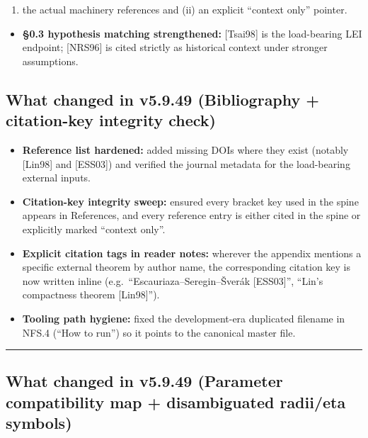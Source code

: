 \documentclass[
  11pt,
]{article}
\providecommand{\tightlist}{%
  \setlength{\itemsep}{0pt}\setlength{\parskip}{0pt}}
\begin{document}
\begin{enumerate}
\def\labelenumi{(\roman{enumi})}
\tightlist
\item
  the actual machinery references and (ii) an explicit ``context only'' pointer.
\end{enumerate}

\begin{itemize}
\tightlist
\item
  \textbf{§0.3 hypothesis matching strengthened:} {[}Tsai98{]} is the load-bearing LEI endpoint; {[}NRS96{]} is cited strictly as historical context under stronger assumptions.
\end{itemize}

\hypertarget{what-changed-in-v5.9.49-bibliography-citation-key-integrity-check}{%
\subsection{What changed in v5.9.49 (Bibliography + citation-key integrity check)}\label{what-changed-in-v5.9.49-bibliography-citation-key-integrity-check}}

\begin{itemize}
\tightlist
\item
  \textbf{Reference list hardened:} added missing DOIs where they exist (notably {[}Lin98{]} and {[}ESS03{]}) and verified the journal metadata for the load-bearing external inputs.
\item
  \textbf{Citation-key integrity sweep:} ensured every bracket key used in the spine appears in References, and every reference entry is either cited in the spine or explicitly marked ``context only''.
\item
  \textbf{Explicit citation tags in reader notes:} wherever the appendix mentions a specific external theorem by author name, the corresponding citation key is now written inline (e.g.~``Escauriaza--Seregin--Šverák {[}ESS03{]}'', ``Lin's compactness theorem {[}Lin98{]}'').
\item
  \textbf{Tooling path hygiene:} fixed the development-era duplicated filename in NFS.4 (``How to run'') so it points to the canonical master file.
\end{itemize}

\begin{center}\rule{0.5\linewidth}{0.5pt}\end{center}

\hypertarget{what-changed-in-v5.9.49-parameter-compatibility-map-disambiguated-radiieta-symbols}{%
\subsection{What changed in v5.9.49 (Parameter compatibility map + disambiguated radii/eta symbols)}\label{what-changed-in-v5.9.49-parameter-compatibility-map-disambiguated-radiieta-symbols}}
\end{document}
